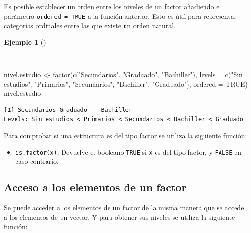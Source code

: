 \documentclass[
  a4paper,
]{scrreport}
\newenvironment{Shaded}{\begin{snugshade}}{\end{snugshade}}
\newcommand{\AttributeTok}[1]{\textcolor[rgb]{0.40,0.45,0.13}{#1}}
\newcommand{\ConstantTok}[1]{\textcolor[rgb]{0.56,0.35,0.01}{#1}}
\newcommand{\FunctionTok}[1]{\textcolor[rgb]{0.28,0.35,0.67}{#1}}
\newcommand{\NormalTok}[1]{\textcolor[rgb]{0.00,0.23,0.31}{#1}}
\newcommand{\OtherTok}[1]{\textcolor[rgb]{0.00,0.23,0.31}{#1}}
\newcommand{\StringTok}[1]{\textcolor[rgb]{0.13,0.47,0.30}{#1}}
\providecommand{\tightlist}{%
  \setlength{\itemsep}{0pt}\setlength{\parskip}{0pt}}\usepackage{longtable,booktabs,array}
\theoremstyle{definition}
\theoremstyle{definition}
\newtheorem{example}{Ejemplo}[chapter]
\theoremstyle{remark}
\begin{document}
Es posible establecer un orden entre los niveles de un factor añadiendo
el parámetro \texttt{ordered\ =\ TRUE} a la función anterior. Esto es
útil para representar categorías ordinales entre las que existe un orden
natural.

\begin{example}[]\protect\hypertarget{exm-creacion-factor-ordenado}{}\label{exm-creacion-factor-ordenado}

~

\begin{Shaded}
\begin{Highlighting}[]
\NormalTok{nivel.estudio }\OtherTok{\textless{}{-}} \FunctionTok{factor}\NormalTok{(}\FunctionTok{c}\NormalTok{(}\StringTok{"Secundarios"}\NormalTok{, }\StringTok{"Graduado"}\NormalTok{, }\StringTok{"Bachiller"}\NormalTok{), }\AttributeTok{levels =} \FunctionTok{c}\NormalTok{(}\StringTok{"Sin estudios"}\NormalTok{, }\StringTok{"Primarios"}\NormalTok{, }\StringTok{"Secundarios"}\NormalTok{, }\StringTok{"Bachiller"}\NormalTok{, }\StringTok{"Graduado"}\NormalTok{), }\AttributeTok{ordered =} \ConstantTok{TRUE}\NormalTok{)}
\NormalTok{nivel.estudio}
\end{Highlighting}
\end{Shaded}

\begin{verbatim}
[1] Secundarios Graduado    Bachiller  
Levels: Sin estudios < Primarios < Secundarios < Bachiller < Graduado
\end{verbatim}

\end{example}

Para comprobar si una estructura es del tipo factor se utiliza la
siguiente función:

\begin{itemize}
\tightlist
\item
  \texttt{is.factor(x)}: Devuelve el booleano \texttt{TRUE} si
  \texttt{x} es del tipo factor, y \texttt{FALSE} en caso contrario.
\end{itemize}

\hypertarget{acceso-a-los-elementos-de-un-factor}{%
\subsection{Acceso a los elementos de un
factor}\label{acceso-a-los-elementos-de-un-factor}}

Se puede acceder a los elementos de un factor de la misma manera que se
accede a los elementos de un vector. Y para obtener sus niveles se
utiliza la siguiente función:
\end{document}
